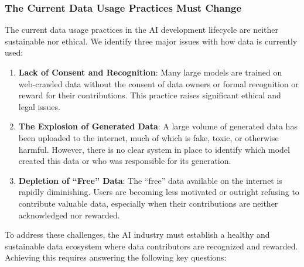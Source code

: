 \subsubsection{The Current Data Usage Practices Must Change}

The current data usage practices in the AI development lifecycle are neither sustainable nor ethical. We identify three major issues with how data is currently used:

\begin{enumerate}[label=\arabic*] 

\item \textbf{Lack of Consent and Recognition}: Many large models are trained on web-crawled data without the consent of data owners or formal recognition or reward for their contributions. This practice raises significant ethical and legal issues.

\item \textbf{The Explosion of Generated Data}: A large volume of generated data has been uploaded to the internet, much of which is fake, toxic, or otherwise harmful. However, there is no clear system in place to identify which model created this data or who was responsible for its generation.

\item \textbf{Depletion of ``Free'' Data}: The ``free'' data available on the internet is rapidly diminishing. Users are becoming less motivated or outright refusing to contribute valuable data, especially when their contributions are neither acknowledged nor rewarded.

\end{enumerate}

To address these challenges, the AI industry must establish a healthy and sustainable data ecosystem where data contributors are recognized and rewarded. Achieving this requires answering the following key questions:

